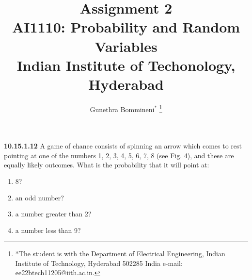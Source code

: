 \documentclass[journal,12pt,twocolumn]{IEEEtran}
\begin{document}
\let\vec\mathbf

\vspace{3cm}

\title{
\textbf {Assignment 2}\\ \large \textbf{AI1110}: Probability and Random Variables\\Indian Institute of Techonology, Hyderabad
}
\author{Gunethra Bommineni$^{*}$%
	\thanks{*The student is with the Department
		of Electrical Engineering, Indian Institute of Technology, Hyderabad
		502285 India e-mail: ee22btech11205@iith.ac.in.}
  }

\maketitle

\newpage


\bigskip
\renewcommand{\thefigure}{\theenumi}
\renewcommand{\thetable}{\theenumi}
\textbf{10.15.1.12}
A game of chance consists of spinning an arrow
which comes to rest pointing at one of the numbers
1, 2, 3, 4, 5, 6, 7, 8 (see Fig. 4), and these are equally
likely outcomes. What is the probability that it will
point at:
\begin{enumerate}[label=(\roman*)]
\item 
8?
\item 
an odd number?
\item 
a number greater than 2?
\item 
a number less than 9?
\end{enumerate}
\end{document}
